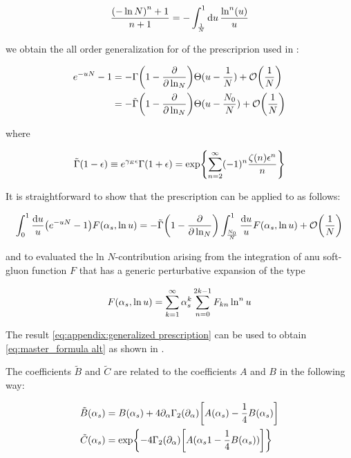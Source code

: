 \documentclass[../main.tex]{subfiles}
\begin{document}
\begin{equation}
    \frac{ \qty(-\ln N)^n+1}{n+1} = -\int_{\frac{1}{N}}^1 \dd{u} \frac{\ln^n(u)}{u}
\end{equation}

we obtain the all order generalization for of the prescriprion used in \cite{CATANI19933}:

\begin{align}
    e^{-uN}-1 &= -\Gamma\qty(1-\pdv{\ln_N}) \Theta(u-\frac{1}{N}) + \order{\frac{1}{N}}\\
              &=  -\tilde{\Gamma}\qty(1-\pdv{\ln_N}) \Theta(u-\frac{N_0}{N}) + \order{\frac{1}{N}} 
\end{align}

where 

\begin{equation}
    \tilde{\Gamma}\qty(1-\epsilon) \equiv e^{\gamma_E \epsilon} \Gamma(1+\epsilon) = \exp{\sum_{n=2}^\infty (-1)^n \frac{ \zeta(n) \epsilon^n}{n}}
\end{equation}

It is straightforward to show that the prescription can be applied to as follows:

\begin{equation} \label{eq:appendix:generalized prescription}
    \int_0^1 \frac{\dd{u}}{u} \qty(e^{-u N} - 1) F\qty(\alpha_s , \ln u) = -\tilde{\Gamma}\qty(1-\pdv{\ln_N}) \int_{\frac{N_0}{N}}^1 \frac{\dd{u}}{u} F\qty(\alpha_s , \ln u) + \order{\frac{1}{N}}
\end{equation}
    
and to evaluated the ln $N$-contribution arising from the integration of anu soft-gluon function $F$ that has a generic perturbative expansion of the type

\begin{equation}
    F\qty(\alpha_s , \ln u) = \sum_{k=1}^\infty \alpha_s^k \sum_{n=0}^{2k-1} F_{kn}\ln^n u
\end{equation}

The result \cref{eq:appendix:generalized prescription} can be used to obtain \cref{eq:master_formula alt} as shown in \cite{Catani_2003_appendix}.

The coefficients $\tilde{B}$ and $\tilde{C}$ are related to the coefficients $A$ and $B$ in the following way:

\begin{align}
\tilde{B}(\alpha_s) &= B(\alpha_s) + 4 \partial_\alpha \Gamma_2(\partial_\alpha) \qty[A(\alpha_s)-\frac{1}{4} B(\alpha_s)] \label{eq:appendix:Btilde}\\ 
\tilde{C}(\alpha_s) &= \exp{-4\Gamma_2(\partial_\alpha) \qty[A(\alpha_s1-\frac{1}{4} B(\alpha_s))]} \label{eq:appendix:Ctilde}
\end{align}
\end{document}
